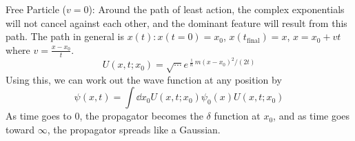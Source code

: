 \documentclass[a4paper,twoside,master.tex]{subfiles}
\begin{document}
\begin{ex}
    Free Particle ($ v=0 $):
    Around the path of least action, the complex exponentials will not cancel against each other, and the dominant feature will result from this path. The path in general is $ x(t)\colon x(t=0)=x_0 $, $ x(t_{\text{final}}) = x $, $ x = x_0 + vt $ where $ v = \frac{x-x_0}{t} $.
    \begin{equation}
        U(x,t;x_0) = \sqrt{\cdots} e^{\frac{\imath}{\hbar} m(x-x_0)^2 / (2t)}
    \end{equation}
    Using this, we can work out the wave function at any position by
    \begin{equation}
        \psi(x,t) = \int \dd{x_0} U(x,t;x_0) \psi_0(x) U(x,t;x_0)
    \end{equation}
    As time goes to $ 0 $, the propagator becomes the $\delta$ function at $ x_0 $, and as time goes toward $ \infty $, the propagator spreads like a Gaussian.
\end{ex}
\end{document}
